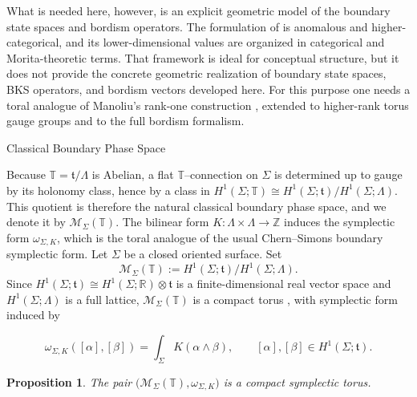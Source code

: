 \documentclass[12pt]{amsart}
\makeatletter
\renewcommand\subsection{\@startsection{subsection}{2}%
  \z@{.5\linespacing\@plus.7\linespacing}{-.5em}%
  {\normalfont\bfseries}}
\numberwithin{equation}{section}
\newtheorem{prop}[theorem]{Proposition}
\makeatother
\begin{document}
What is needed here, however, is an explicit geometric model of the boundary state spaces and bordism operators. The formulation of \cite{FreedHopkinsLurieTeleman} is anomalous and higher-categorical, and its lower-dimensional values are organized in categorical and Morita-theoretic terms. That framework is ideal for conceptual structure, but it does not provide the concrete geometric realization of boundary state spaces, BKS operators, and bordism vectors developed here. For this purpose one needs a toral analogue of Manoliu’s rank-one construction \cite{Manoliu1,Manoliu2}, extended to higher-rank torus gauge groups and to the full bordism formalism.



\subsection{Classical Boundary Phase Space}

Because \(\mathbb T=\mathfrak t/\Lambda\) is Abelian, a flat
\(\mathbb T\)--connection on \(\Sigma\) is determined up to gauge by its
holonomy class, hence by a class in
\(H^1(\Sigma;\mathbb T)\cong H^1(\Sigma;\mathfrak t)/H^1(\Sigma;\Lambda)\).
This quotient is therefore the natural classical boundary phase space, and we
denote it by \(\mathcal M_\Sigma(\mathbb T)\). The bilinear form \(K:\Lambda\times\Lambda\to\mathbb Z\) induces the symplectic form
\(\omega_{\Sigma,K}\), which is the toral analogue of the usual Chern--Simons boundary symplectic form. Let \(\Sigma\) be a closed oriented surface. Set
\begin{equation}
\mathcal{M}_\Sigma(\mathbb T)
:=
H^1(\Sigma;\mathfrak t)\big/H^1(\Sigma;\Lambda).
\end{equation}
Since \(H^1(\Sigma;\mathfrak t)\cong H^1(\Sigma;\mathbb R)\otimes\mathfrak t\)
is a finite-dimensional real vector space and \(H^1(\Sigma;\Lambda)\) is a full lattice,
\(\mathcal{M}_\Sigma(\mathbb T)\) is a compact torus \cite{FreedCS,Atiyah:1990}, with symplectic form induced by

\begin{equation}
\omega_{\Sigma,K}([\alpha],[\beta])
=
\int_\Sigma K(\alpha\wedge\beta),
\qquad
[\alpha],[\beta]\in H^1(\Sigma;\mathfrak t).
\end{equation}


\begin{prop}
\label{prop:toral-phase-space}
The pair $\bigl(\mathcal{M}_\Sigma(\mathbb T),\omega_{\Sigma,K}\bigr)$ is a compact symplectic torus.
\end{prop}
\end{document}
